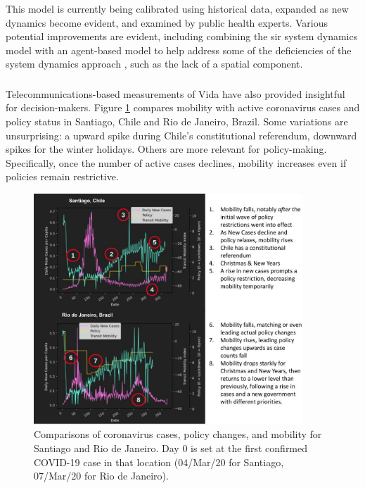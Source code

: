 This model is currently being calibrated using historical data, expanded as new dynamics become evident, and examined by public health experts. Various potential improvements are evident, including combining the \ac{sir} system dynamics model with an agent-based model to help address some of the deficiencies of the system dynamics approach \cite{ahmedVarianceSystemDynamics2012}, such as the lack of a spatial component.

\subsubsection{}

Telecommunications-based measurements of Vida have also provided insightful for decision-makers. Figure \ref{fig:mob} compares mobility with active coronavirus cases and policy status in Santiago, Chile and Rio de Janeiro, Brazil. Some variations are unsurprising: a upward spike during Chile's constitutional referendum, downward spikes for the winter holidays. Others are more relevant for policy-making. Specifically, once the number of active cases declines, mobility increases even if policies remain restrictive.

\begin{figure}[h]
\centering
\includegraphics[width=0.9\textwidth]{Figures/chap5/Mobility-Graphs.jpg}
\caption[Mobility, coronavirus cases, and policy changes in Rio de Janeiro]{Comparisons of coronavirus cases, policy changes, and mobility for Santiago and Rio de Janeiro. Day 0 is set at the first confirmed COVID-19 case in that location (04/Mar/20 for Santiago, 07/Mar/20 for Rio de Janeiro).}
\label{fig:mob}
\end{figure}

